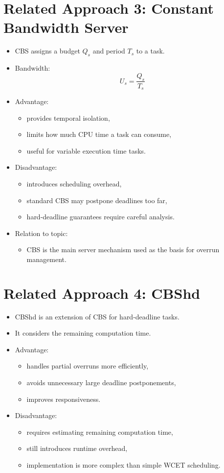 \documentclass[a4paper,11pt]{article}
\begin{document}
\section*{Related Approach 3: Constant Bandwidth Server}

\begin{itemize}
    \item CBS assigns a budget $Q_s$ and period $T_s$ to a task.
    \item Bandwidth:
    \[
        U_s = \frac{Q_s}{T_s}
    \]
    \item Advantage:
    \begin{itemize}
        \item provides temporal isolation,
        \item limits how much CPU time a task can consume,
        \item useful for variable execution time tasks.
    \end{itemize}
    \item Disadvantage:
    \begin{itemize}
        \item introduces scheduling overhead,
        \item standard CBS may postpone deadlines too far,
        \item hard-deadline guarantees require careful analysis.
    \end{itemize}
    \item Relation to topic:
    \begin{itemize}
        \item CBS is the main server mechanism used as the basis for overrun management.
    \end{itemize}
\end{itemize}

\section*{Related Approach 4: CBShd}

\begin{itemize}
    \item CBShd is an extension of CBS for hard-deadline tasks.
    \item It considers the remaining computation time.
    \item Advantage:
    \begin{itemize}
        \item handles partial overruns more efficiently,
        \item avoids unnecessary large deadline postponements,
        \item improves responsiveness.
    \end{itemize}
    \item Disadvantage:
    \begin{itemize}
        \item requires estimating remaining computation time,
        \item still introduces runtime overhead,
        \item implementation is more complex than simple WCET scheduling.
    \end{itemize}
\end{itemize}
\end{document}
